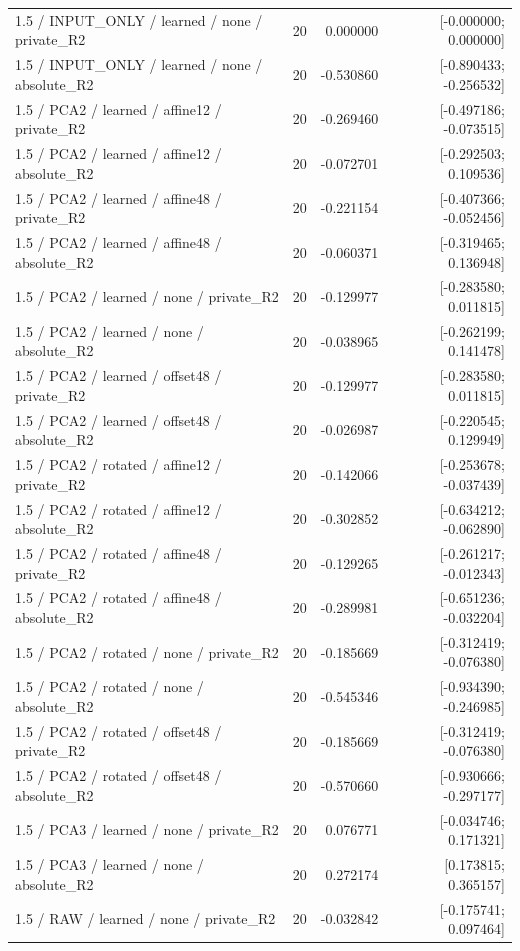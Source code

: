 \begin{longtable}{p{.56\linewidth}rrr}
1.5 / INPUT\_ONLY / learned / none / private\_R2 & 20 & 0.000000 & [-0.000000; 0.000000] \\
1.5 / INPUT\_ONLY / learned / none / absolute\_R2 & 20 & -0.530860 & [-0.890433; -0.256532] \\
1.5 / PCA2 / learned / affine12 / private\_R2 & 20 & -0.269460 & [-0.497186; -0.073515] \\
1.5 / PCA2 / learned / affine12 / absolute\_R2 & 20 & -0.072701 & [-0.292503; 0.109536] \\
1.5 / PCA2 / learned / affine48 / private\_R2 & 20 & -0.221154 & [-0.407366; -0.052456] \\
1.5 / PCA2 / learned / affine48 / absolute\_R2 & 20 & -0.060371 & [-0.319465; 0.136948] \\
1.5 / PCA2 / learned / none / private\_R2 & 20 & -0.129977 & [-0.283580; 0.011815] \\
1.5 / PCA2 / learned / none / absolute\_R2 & 20 & -0.038965 & [-0.262199; 0.141478] \\
1.5 / PCA2 / learned / offset48 / private\_R2 & 20 & -0.129977 & [-0.283580; 0.011815] \\
1.5 / PCA2 / learned / offset48 / absolute\_R2 & 20 & -0.026987 & [-0.220545; 0.129949] \\
1.5 / PCA2 / rotated / affine12 / private\_R2 & 20 & -0.142066 & [-0.253678; -0.037439] \\
1.5 / PCA2 / rotated / affine12 / absolute\_R2 & 20 & -0.302852 & [-0.634212; -0.062890] \\
1.5 / PCA2 / rotated / affine48 / private\_R2 & 20 & -0.129265 & [-0.261217; -0.012343] \\
1.5 / PCA2 / rotated / affine48 / absolute\_R2 & 20 & -0.289981 & [-0.651236; -0.032204] \\
1.5 / PCA2 / rotated / none / private\_R2 & 20 & -0.185669 & [-0.312419; -0.076380] \\
1.5 / PCA2 / rotated / none / absolute\_R2 & 20 & -0.545346 & [-0.934390; -0.246985] \\
1.5 / PCA2 / rotated / offset48 / private\_R2 & 20 & -0.185669 & [-0.312419; -0.076380] \\
1.5 / PCA2 / rotated / offset48 / absolute\_R2 & 20 & -0.570660 & [-0.930666; -0.297177] \\
1.5 / PCA3 / learned / none / private\_R2 & 20 & 0.076771 & [-0.034746; 0.171321] \\
1.5 / PCA3 / learned / none / absolute\_R2 & 20 & 0.272174 & [0.173815; 0.365157] \\
1.5 / RAW / learned / none / private\_R2 & 20 & -0.032842 & [-0.175741; 0.097464] \\

\end{longtable}
